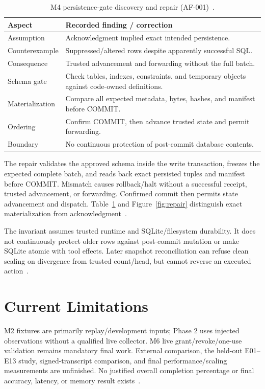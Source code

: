 \documentclass[conference]{IEEEtran}
\begin{document}
\begin{table}[t]
\centering
\caption{M4 persistence-gate discovery and repair (AF-001)~\cite{cgresults}.}
\label{tab:repair}
\small
\setlength{\tabcolsep}{3pt}
\renewcommand{\arraystretch}{1.15}
\begin{tabular}{@{}p{}p{}@{}}
\toprule
Aspect & Recorded finding / correction \\
\midrule
Assumption & Acknowledgment implied exact intended persistence. \\
Counterexample & Suppressed/altered rows despite apparently successful SQL. \\
Consequence & Trusted advancement and forwarding without the full batch. \\
Schema gate & Check tables, indexes, constraints, and temporary objects against code-owned definitions. \\
Materialization & Compare all expected metadata, bytes, hashes, and manifest before COMMIT. \\
Ordering & Confirm COMMIT, then advance trusted state and permit forwarding. \\
Boundary & No continuous protection of post-commit database contents. \\
\bottomrule
\end{tabular}
\end{table}

The repair validates the approved schema inside the write transaction, freezes the expected complete batch, and reads back exact persisted tuples and manifest before COMMIT. Mismatch causes rollback/halt without a successful receipt, trusted advancement, or forwarding. Confirmed commit then permits state advancement and dispatch. Table~\ref{tab:repair} and Figure~\ref{fig:repair} distinguish exact materialization from acknowledgment~\cite{cgresults}.


The invariant assumes trusted runtime and SQLite/filesystem durability. It does not continuously protect older rows against post-commit mutation or make SQLite atomic with tool effects. Later snapshot reconciliation can refuse clean sealing on divergence from trusted count/head, but cannot reverse an executed action~\cite{cgthreat,cglock}.

\section{Current Limitations}
M2 fixtures are primarily replay/development inputs; Phase 2 uses injected observations without a qualified live collector. M6 live grant/revoke/one-use validation remains mandatory final work. External comparison, the held-out E01--E13 study, signed-transcript comparison, and final performance/scaling measurements are unfinished. No justified overall completion percentage or final accuracy, latency, or memory result exists~\cite{cgresults,cgprotocol}.
\end{document}
